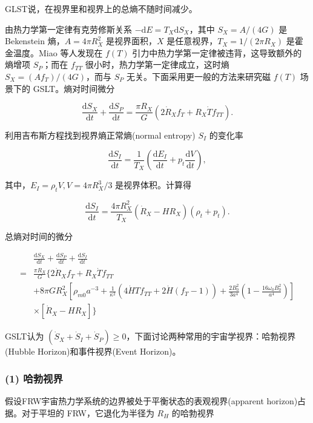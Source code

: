 \documentclass[aps,prl,preprint,groupedaddress,showkeys]{revtex4-2}
\begin{document}
GLST说，在视界里和视界上的总熵不随时间减少。

由热力学第一定律有克劳修斯关系 $-\mathrm{d}E=T_X\mathrm{d}S_X$，其中 $S_X=A/(4G)$ 是 Bekenstein 熵，$A=4\pi R_X^2$ 是视界面积，$X$ 是任意视界，$T_X=1/(2\pi R_X)$ 是霍金温度。Miao 等人发现在 $f(T)$ 引力中热力学第一定律被违背，这导致额外的熵增项 $S_P$；而在 $f_{TT}$ 很小时，热力学第一定律成立，这时熵 $S_X=(Af_T)/(4G)$，而与 $S_P$ 无关。下面采用更一般的方法来研究磁 $f(T)$ 场景下的 GSLT。熵对时间微分

$$
\frac{\mathrm{d}S_X }{\mathrm{d}t } + \frac{\mathrm{d}S_P }{\mathrm{d}t } = \frac{\pi R_X }{G } \left(2\dot{R}_X f_T + R_X\dot{T} f_{TT} \right).
$$

利用吉布斯方程找到视界熵正常熵(normal entropy) $S_I$ 的变化率

$$
\frac{\mathrm{d}S_I }{\mathrm{d}t } 
=\frac{1 }{T_X } \left(\frac{\mathrm{d}E_I }{\mathrm{d}t } + p_t\frac{\mathrm{d}V }{\mathrm{d}t }  \right),
$$

其中，$E_I=\rho_t V,V=4\pi R_X^3/3$ 是视界体积。计算得

$$
\frac{\mathrm{d}S_I }{\mathrm{d}t } 
=\frac{4\pi R_X^2 }{T_X } \left(\dot{R}_X - H R_X \right)\left(\rho_t+p_t \right).
$$

总熵对时间的微分

$$
\begin{aligned}
    &\frac{\mathrm{d}S_X }{\mathrm{d}t } + \frac{\mathrm{d}S_P }{\mathrm{d}t } + \frac{\mathrm{d}S_I }{\mathrm{d}t } \\
    =&\frac{\pi R_X }{G } \bigg\{2\dot{R}_X f_T + R_X\dot{T}f_{TT} \\
    &+ 8\pi G R_X^2 \left[\rho_{m0}a^{-3} + \frac{1 }{\kappa^2 } \left(4\dot{H} T f_{TT} + 2\dot{H}\left(f_T-1 \right) \right) + \frac{2B_0^2 }{3a^4 } \left(1-\frac{16\omega_0 B_0^2 }{a^4 }  \right) \right] \\
    &\times \left[\dot{R}_X - H R_X \right] \bigg\}
\end{aligned}
$$

GSLT认为 $(\dot{S}_X+\dot{S}_I+\dot{S}_P)\geq 0$，下面讨论两种常用的宇宙学视界：哈勃视界(Hubble Horizon)和事件视界(Event Horizon)。

\subsubsection{(1) 哈勃视界}

假设FRW宇宙热力学系统的边界被处于平衡状态的表观视界(apparent horizon)占据。对于平坦的 FRW，它退化为半径为 $R_H$ 的哈勃视界
\end{document}
